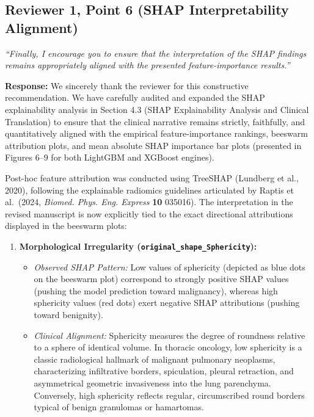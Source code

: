 \documentclass[11pt,a4paper]{article}
\newcommand{\reviewer}[1]{{\color{reviewgray}\textit{#1}}}
\newenvironment{authorresponse}{\par\begingroup\color{authorblue}}{\endgroup\par}
\begin{document}
\vspace{1.5em}

\subsection*{Reviewer 1, Point 6 (SHAP Interpretability Alignment)}

\reviewer{“Finally, I encourage you to ensure that the interpretation of the SHAP findings remains appropriately aligned with the presented feature-importance results.”}

\begin{authorresponse}
\textbf{Response:}
We sincerely thank the reviewer for this constructive recommendation. We have carefully audited and expanded the SHAP explainability analysis in Section 4.3 (SHAP Explainability Analysis and Clinical Translation) to ensure that the clinical narrative remains strictly, faithfully, and quantitatively aligned with the empirical feature-importance rankings, beeswarm attribution plots, and mean absolute SHAP importance bar plots (presented in Figures 6--9 for both LightGBM and XGBoost engines).

Post-hoc feature attribution was conducted using TreeSHAP (Lundberg et al., 2020), following the explainable radiomics guidelines articulated by Raptis et al.\ (2024, \textit{Biomed. Phys. Eng. Express} \textbf{10} 035016). The interpretation in the revised manuscript is now explicitly tied to the exact directional attributions displayed in the beeswarm plots:
\begin{enumerate}[leftmargin=2em]
  \item \textbf{Morphological Irregularity (\texttt{original\_shape\_Sphericity}):}
  \begin{itemize}
    \item \textit{Observed SHAP Pattern:} Low values of sphericity (depicted as blue dots on the beeswarm plot) correspond to strongly positive SHAP values (pushing the model prediction toward malignancy), whereas high sphericity values (red dots) exert negative SHAP attributions (pushing toward benignity).
    \item \textit{Clinical Alignment:} Sphericity measures the degree of roundness relative to a sphere of identical volume. In thoracic oncology, low sphericity is a classic radiological hallmark of malignant pulmonary neoplasms, characterizing infiltrative borders, spiculation, pleural retraction, and asymmetrical geometric invasiveness into the lung parenchyma. Conversely, high sphericity reflects regular, circumscribed round borders typical of benign granulomas or hamartomas.
  \end{itemize}
  

\end{enumerate}
\end{authorresponse}
\end{document}
